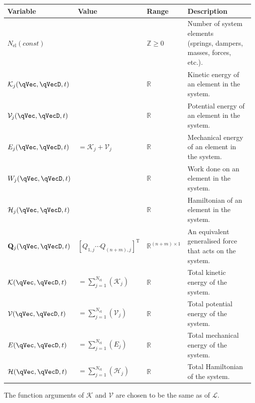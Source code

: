 \documentclass[11pt]{article}
\begin{document}
\begin{center}
\begin{threeparttable}
\begin{tabular}{llll}
    \textbf{Variable} & \textbf{Value} & \textbf{Range} & \textbf{Description}\\
    \hline
    $N_{\mathrm{el}}(const)$
        &
        & $\mathbb{Z} \geq 0$
        & \makecell[tl]{Number of system elements \\(springs, dampers, masses, forces, etc.).} \\
    $\mathcal{K}_j(\qVec, \qVecD, t)$
        &
        & $\mathbb{R}$
        & Kinetic energy of an element in the system. \\
    $\mathcal{V}_j(\qVec, \qVecD, t)$
        &
        & $\mathbb{R}$
        & Potential energy of an element in the system. \\
    $E_j(\qVec, \qVecD, t)$
        & $=\mathcal{K}_j + \mathcal{V}_j$
        & $\mathbb{R}$
        & Mechanical energy of an element in the system. \\
    $W_j(\qVec, \qVecD, t)$
        &
        & $\mathbb{R}$
        & Work done on an element in the system. \\
    $\mathcal{H}_j(\qVec, \qVecD, t)$
        &
        & $\mathbb{R}$
        & Hamiltonian of an element in the system. \\
    $\mathbf{Q}_{j}(\qVec, \qVecD, t)$
        & $[Q_{1,j} \cdots Q_{(n+m),j}]^{\mathrm{T}}$
        & $\mathbb{R}^{(n+m)\times1}$
        & An equivalent generalised force that acts on the system\tnote{1,2}. \\
    $\mathcal{K}(\qVec, \qVecD, t)$
        & $=\sum_{j=1}^{N_\mathrm{el}}(\mathcal{K}_j)$
        & $\mathbb{R}$
        & Total kinetic energy of the system. \\
    $\mathcal{V}(\qVec, \qVecD, t)$
        & $=\sum_{j=1}^{N_\mathrm{el}}(\mathcal{V}_j)$
        & $\mathbb{R}$
        & Total potential energy of the system. \\
    $E(\qVec, \qVecD, t)$
        & $=\sum_{j=1}^{N_\mathrm{el}}(E_j)$
        & $\mathbb{R}$
        & Total mechanical energy of the system. \\
    $\mathcal{H}(\qVec, \qVecD, t)$
        & $=\sum_{j=1}^{N_\mathrm{el}}(\mathcal{H}_j)$
        & $\mathbb{R}$
        & Total Hamiltonian of the system. \\
\end{tabular}
\begin{tablenotes}
    \item[\textbullet] The function arguments of $\mathcal{K}$ and $\mathcal{V}$ are chosen to be the same as of $\mathcal{L}$.

\end{tablenotes}
\end{threeparttable}
\end{center}
\end{document}
